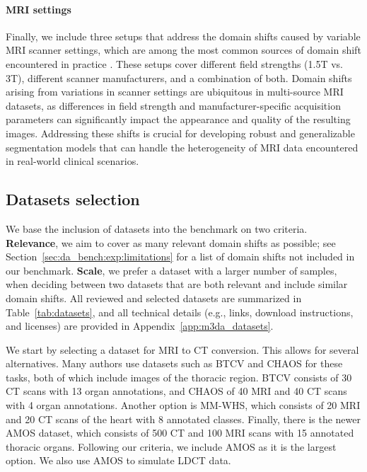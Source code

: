 \paragraph{MRI settings}

Finally, we include three setups that address the domain shifts caused by variable MRI scanner settings, which are among the most common sources of domain shift encountered in practice \cite{yan2020mri,medim_da_survey_2023}. These setups cover different field strengths (1.5T vs. 3T), different scanner manufacturers, and a combination of both. Domain shifts arising from variations in scanner settings are ubiquitous in multi-source MRI datasets, as differences in field strength and manufacturer-specific acquisition parameters can significantly impact the appearance and quality of the resulting images. Addressing these shifts is crucial for developing robust and generalizable segmentation models that can handle the heterogeneity of MRI data encountered in real-world clinical scenarios.



\subsection{Datasets selection}

We base the inclusion of datasets into the benchmark on two criteria. \textbf{Relevance}, we aim to cover as many relevant domain shifts as possible; see Section~\ref{sec:da_bench:exp:limitations} for a list of domain shifts not included in our benchmark. \textbf{Scale}, we prefer a dataset with a larger number of samples, when deciding between two datasets that are both relevant and include similar domain shifts. All reviewed and selected datasets are summarized in Table~\ref{tab:datasets}, and all technical details (e.g., links, download instructions, and licenses) are provided in Appendix~\ref{app:m3da_datasets}.



We start by selecting a dataset for MRI to CT conversion. This allows for several alternatives. Many authors use datasets such as BTCV and CHAOS for these tasks, both of which include images of the thoracic region. BTCV consists of 30 CT scans with 13 organ annotations, and CHAOS of 40 MRI and 40 CT scans with 4 organ annotations. Another option is MM-WHS, which consists of 20 MRI and 20 CT scans of the heart with 8 annotated classes. Finally, there is the newer AMOS dataset, which consists of 500 CT and 100 MRI scans with 15 annotated thoracic organs. Following our criteria, we include AMOS as it is the largest option. We also use AMOS to simulate LDCT data.


